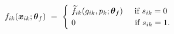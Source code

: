 \begin{equation}
\begin{split}
    f_{ik} (\boldsymbol{x}_{ik}; \boldsymbol{\theta}_{f}) \
    & = \ 
    \begin{cases}
        \ \widetilde{f}_{ik} (g_{ik}, p_{k}; \boldsymbol{\theta}_{f}) \hspace{0.5cm} \text{if $s_{ik} = 0$} \\
        \ 0  \hspace{2.55cm} \text{if $s_{ik} = 1$}.
    \end{cases}
\end{split}
\label{Equation:Firms-Problem_Flow-Payoff}
\end{equation}